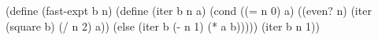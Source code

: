 \begtt\scm
(define (fast-expt b n)
  (define (iter b n a)
    (cond ((= n 0) a)
          ((even? n) (iter (square b) (/ n 2) a))
          (else (iter b (- n 1) (* a b)))))
  (iter b n 1))
\endtt
